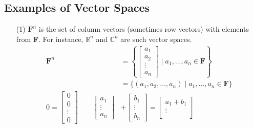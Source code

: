 \documentclass[11pt]{article}
\begin{document}
    \subsection{Examples of Vector Spaces}

    \begin{enumerate}
        \item[(1)] \(\textbf{F}^n\) is the set of column vectors (sometimes row vectors) with elements from \textbf{F}. For instance, \(\mathbb{R}^n\) and \(\mathbb{C}^n\) are such vector spaces.
        \begin{align*}
            \textbf{F}^n &= \left\{ \begin{bmatrix}
                                        a_1    \\
                                        a_2    \\
                                        \vdots \\
                                        a_n
                                    \end{bmatrix} \mid a_1, \dots, a_n \in \textbf{F} \right\} \\
                         &= \{(a_1, a_2, \dots, a_n) \mid a_1, \dots, a_n \in \textbf{F}\}     \\
            0            = \begin{bmatrix}
                                0      \\
                                0      \\
                                \vdots \\
                                0
                            \end{bmatrix} \qquad
            \begin{bmatrix}
                a_1    \\
                \vdots \\
                a_n
            \end{bmatrix} &+ \begin{bmatrix}
                                b_1    \\
                                \vdots \\
                                b_n
                            \end{bmatrix} = \begin{bmatrix}
                                                a_1 + b_1 \\
                                                \vdots    \\

\end{bmatrix}
\end{align*}
\end{enumerate}
\end{document}

